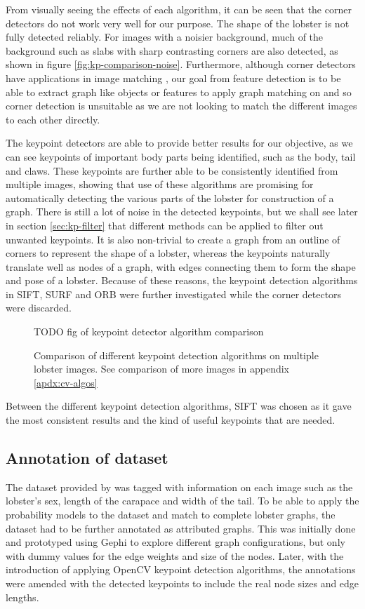 \noindent
From visually seeing the effects of each algorithm, it can be seen that the corner detectors do not work very well for our purpose. The shape of the lobster is not fully detected reliably. For images with a noisier background, much of the background such as slabs with sharp contrasting corners are also detected, as shown in figure \ref{fig:kp-comparison-noise}. Furthermore, although corner detectors have applications in image matching \cite{corner-detection}, our goal from feature detection is to be able to extract graph like objects or features to apply graph matching on and so corner detection is unsuitable as we are not looking to match the different images to each other directly. 

The keypoint detectors are able to provide better results for our objective, as we can see keypoints of important body parts being identified, such as the body, tail and claws. These keypoints are further able to be consistently identified from multiple images, showing that use of these algorithms are promising for automatically detecting the various parts of the lobster for construction of a graph. There is still a lot of noise in the detected keypoints, but we shall see later in section \ref{sec:kp-filter} that different methods can be applied to filter out unwanted keypoints. It is also non-trivial to create a graph from an outline of corners to represent the shape of a lobster, whereas the keypoints naturally translate well as nodes of a graph, with edges connecting them to form the shape and pose of a lobster. Because of these reasons, the keypoint detection algorithms in SIFT, SURF and ORB were further investigated while the corner detectors were discarded.

\begin{figure}[H]
\centering
TODO  fig of keypoint detector algorithm comparison
\caption{Comparison of different keypoint detection algorithms on multiple lobster images. See comparison of more images in appendix \ref{apdx:cv-algos}}
\end{figure}
\noindent

Between the different keypoint detection algorithms, SIFT was chosen as it gave the most consistent results and the kind of useful keypoints that are needed.

\subsection{Annotation of dataset}
The dataset provided by \cite{lobster-thesis} was tagged with information on each image such as the lobster's sex, length of the carapace and width of the tail. To be able to apply the probability models to the dataset and match to complete lobster graphs, the dataset had to be further annotated as attributed graphs. This was initially done and prototyped using Gephi to explore different graph configurations, but only with dummy values for the edge weights and size of the nodes. Later, with the introduction of applying OpenCV keypoint detection algorithms, the annotations were amended with the detected keypoints to include the real node sizes and edge lengths.

